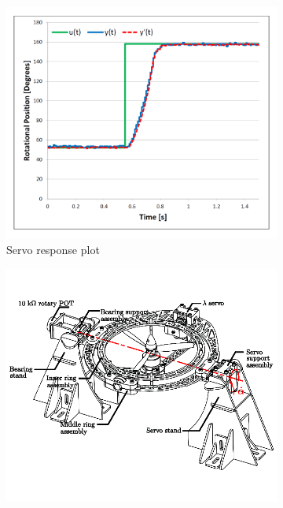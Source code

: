 \begin{figure}[htbp]
\begin{subfigure}{0.46\textwidth}
\includegraphics[width=\textwidth]{graphs/servo-step-inner}
\caption{Servo response plot}
\label{fig:servo-step-inner}
\end{subfigure}
\vspace{-5pt}
\caption{Inner ring servo characteristics}
\label{fig:servo-inner-character}
\begin{subfigure}{0.46\textwidth}
\centering
\includegraphics[width=\textwidth]{figs/servo-middle}

\end{subfigure}
\end{figure}
